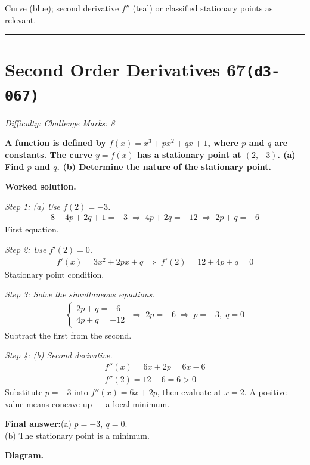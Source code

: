 \documentclass[11pt]{article}
\newcommand{\question}[1]{\par\medskip\noindent\textbf{#1}\par}
\begin{document}
\small Curve (blue); second derivative $f''$ (teal) or classified stationary points as relevant.\normalsize

\medskip\hrule

\section*{Second Order Derivatives 67\quad\small\texttt{(d3-067)}}
\textit{Difficulty: Challenge \quad\textbar\quad Marks: 8}

\question{A function is defined by \( f(x) = x^3 + px^2 + qx + 1 \), where \( p \) and \( q \) are constants. The curve \( y = f(x) \) has a stationary point at \( (2, -3) \). (a) Find \( p \) and \( q \). (b) Determine the nature of the stationary point.}

\textbf{Worked solution.}

\textit{Step 1: (a) Use \( f(2) = -3 \).}
\[\begin{gathered}
8 + 4p + 2q + 1 = -3 \;\Rightarrow\; 4p + 2q = -12 \;\Rightarrow\; 2p + q = -6
\end{gathered}\]
First equation.

\textit{Step 2: Use \( f'(2) = 0 \).}
\[\begin{gathered}
f'(x) = 3x^2 + 2px + q \;\Rightarrow\; f'(2) = 12 + 4p + q = 0
\end{gathered}\]
Stationary point condition.

\textit{Step 3: Solve the simultaneous equations.}
\[\begin{gathered}
\begin{cases} 2p + q = -6 \\ 4p + q = -12 \end{cases} \;\Rightarrow\; 2p = -6 \;\Rightarrow\; p = -3, \; q = 0
\end{gathered}\]
Subtract the first from the second.

\textit{Step 4: (b) Second derivative.}
\[\begin{gathered}
f''(x) = 6x + 2p = 6x - 6 \\ f''(2) = 12 - 6 = 6 > 0
\end{gathered}\]
Substitute \(p = -3\) into \( f''(x) = 6x + 2p \), then evaluate at \(x = 2\). A positive value means concave up --- a local minimum.

\begin{answerbox}
\textbf{Final answer:}\quad (a) \(\displaystyle  p = -3,\ q = 0 \). \\[3pt]  (b) The stationary point is a minimum.
\end{answerbox}
\textbf{Diagram.}
\end{document}
